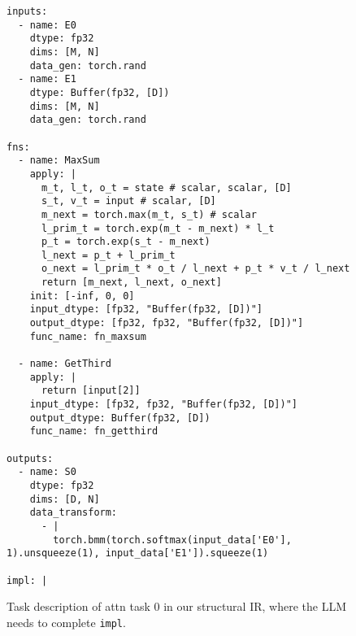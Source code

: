 \begin{figure}[htbp]
\centering
\begin{lstlisting}[language=step, mathescape=true, basicstyle=\scriptsize\ttfamily]
inputs:
  - name: E0
    dtype: fp32
    dims: [M, N]
    data_gen: torch.rand
  - name: E1
    dtype: Buffer(fp32, [D])
    dims: [M, N]
    data_gen: torch.rand
  
fns:
  - name: MaxSum
    apply: |
      m_t, l_t, o_t = state # scalar, scalar, [D]
      s_t, v_t = input # scalar, [D]
      m_next = torch.max(m_t, s_t) # scalar
      l_prim_t = torch.exp(m_t - m_next) * l_t
      p_t = torch.exp(s_t - m_next)
      l_next = p_t + l_prim_t
      o_next = l_prim_t * o_t / l_next + p_t * v_t / l_next
      return [m_next, l_next, o_next]
    init: [-inf, 0, 0]
    input_dtype: [fp32, "Buffer(fp32, [D])"]
    output_dtype: [fp32, fp32, "Buffer(fp32, [D])"]
    func_name: fn_maxsum

  - name: GetThird
    apply: |
      return [input[2]]
    input_dtype: [fp32, fp32, "Buffer(fp32, [D])"]
    output_dtype: Buffer(fp32, [D])
    func_name: fn_getthird

outputs:
  - name: S0
    dtype: fp32
    dims: [D, N]
    data_transform:
      - |
        torch.bmm(torch.softmax(input_data['E0'], 1).unsqueeze(1), input_data['E1']).squeeze(1)

impl: |
\end{lstlisting}
\caption{Task description of attn task 0 in our structural IR, where the LLM needs to complete \texttt{impl}.}
\label{fig:attn-task0-desc}
\end{figure}

